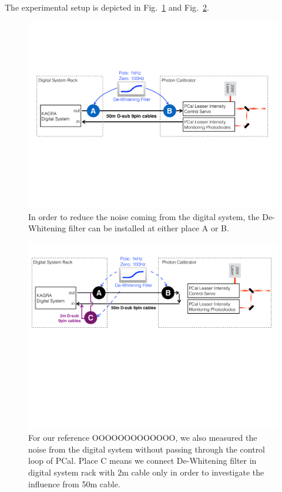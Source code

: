 The experimental setup is depicted in Fig.~\ref{fig:dew_setup} and Fig.~\ref{fig:dew_setup2m}.\\

\begin{figure}[hbt!]
\centering
\includegraphics[width=1\textwidth]{figure/dew_setup.pdf}
\caption[setup]{In order to reduce the noise coming from the digital system, the De-Whitening filter can be installed at either place A or B.    }
\label{fig:dew_setup}
\end{figure}

\begin{figure}[hbt!]
\centering
\includegraphics[width=1\textwidth]{figure/dew_setup2m.pdf}
\caption[setup]{For our reference OOOOOOOOOOOOO, we also measured the noise from the digital system without passing through the control loop of PCal. Place C means we connect De-Whitening filter in digital system rack with 2m cable only in order to investigate the influence from 50m cable.}
\label{fig:dew_setup2m}
\end{figure}


